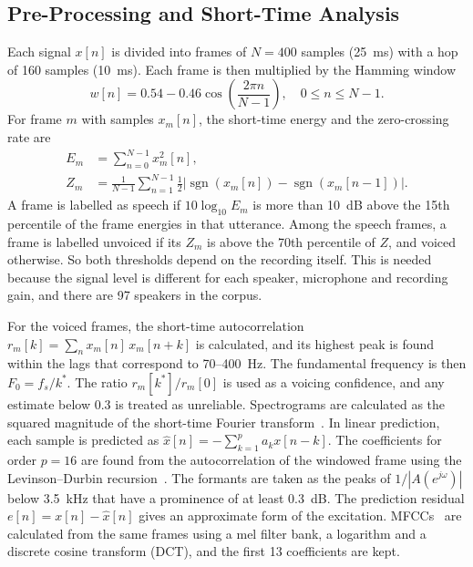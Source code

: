 \documentclass[conference]{IEEEtran}
\begin{document}
\subsection{Pre-Processing and Short-Time Analysis}
Each signal $x[n]$ is divided into frames of $N = 400$ samples (25~ms) with a hop of 160 samples (10~ms). Each frame is then multiplied by the Hamming window
\begin{equation}
w[n] = 0.54 - 0.46\cos\!\left(\frac{2\pi n}{N-1}\right), \quad 0 \le n \le N-1 .
\end{equation}
For frame $m$ with samples $x_m[n]$, the short-time energy and the zero-crossing rate are
\begin{align}
E_m &= \sum_{n=0}^{N-1} x_m^2[n], \\
Z_m &= \frac{1}{N-1}\sum_{n=1}^{N-1} \tfrac{1}{2}\left|\operatorname{sgn}(x_m[n]) - \operatorname{sgn}(x_m[n-1])\right| .
\end{align}
A frame is labelled as speech if $10\log_{10}E_m$ is more than 10~dB above the 15th percentile of the frame energies in that utterance. Among the speech frames, a frame is labelled unvoiced if its $Z_m$ is above the 70th percentile of $Z$, and voiced otherwise. So both thresholds depend on the recording itself. This is needed because the signal level is different for each speaker, microphone and recording gain, and there are 97 speakers in the corpus.

For the voiced frames, the short-time autocorrelation $r_m[k] = \sum_{n} x_m[n]\,x_m[n+k]$ is calculated, and its highest peak is found within the lags that correspond to 70--400~Hz. The fundamental frequency is then $F_0 = f_s/k^{\ast}$. The ratio $r_m[k^{\ast}]/r_m[0]$ is used as a voicing confidence, and any estimate below 0.3 is treated as unreliable. Spectrograms are calculated as the squared magnitude of the short-time Fourier transform~\cite{allen1977stft}. In linear prediction, each sample is predicted as $\hat{x}[n] = -\sum_{k=1}^{p} a_k x[n-k]$. The coefficients for order $p = 16$ are found from the autocorrelation of the windowed frame using the Levinson--Durbin recursion~\cite{makhoul1975lp}. The formants are taken as the peaks of $1/|A(e^{j\omega})|$ below 3.5~kHz that have a prominence of at least 0.3~dB. The prediction residual $e[n] = x[n]-\hat{x}[n]$ gives an approximate form of the excitation. MFCCs~\cite{davis1980mfcc} are calculated from the same frames using a mel filter bank, a logarithm and a discrete cosine transform (DCT), and the first 13 coefficients are kept.
\end{document}
